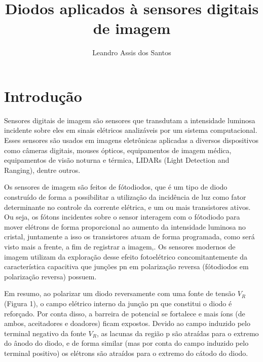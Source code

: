 \documentclass[10pt,a4paper,twocolumn]{article}
\title{\textbf{Diodos aplicados à sensores digitais de imagem}}
\author{Leandro Assis dos Santos}
\begin{document}
\maketitle

\section*{Introdução}
		Sensores digitais de imagem são sensores que transdutam a intensidade luminosa incidente sobre eles em sinais elétricos analizáveis por um sistema computacional. Esses sensores são usados em imagens eletrônicas aplicadas a diversos dispositivos como câmeras digitais, mouses ópticos, equipamentos de imagem médica, equipamentos de visão noturna e térmica, LIDARs (Light Detection and Ranging), dentre outros.
				
		Os sensores de imagem são feitos de fótodiodos, que é um tipo de diodo construído de forma a possibilitar a utilização da incidência de luz como fator determinante no controle da corrente elétrica, e um ou mais transistores ativos. Ou seja, os fótons incidentes sobre o sensor interagem com o fótodiodo para mover elétrons de forma proporcional ao aumento da intensidade luminosa no cristal, juntamente a isso os transistores atuam de forma programada, como será visto mais a frente, a fim de registrar a imagem,. Os sensores modernos de imagem utilizam da exploração desse efeito fotoelétrico concomitantemente da característica capacitiva que junções pn em polarização reversa (fótodiodos em polarização reversa) possuem. 
		
		Em resumo, ao polarizar um diodo reversamente com uma fonte de tensão $V_{R}$ (Figura 1), o campo elétrico interno da junção pn que constitui o diodo é reforçado. Por conta disso, a barreira de potencial se fortalece e mais íons (de ambos, aceitadores e doadores) ficam expostos. Devido ao campo induzido pelo terminal negativo da fonte $V_{R}$, as lacunas da região p são atraídas para o extremo do ânodo do diodo, e de forma similar (mas por conta do campo induzido pelo terminal positivo) os elétrons são atraídos para o extremo do cátodo do diodo.
		
\end{document}
